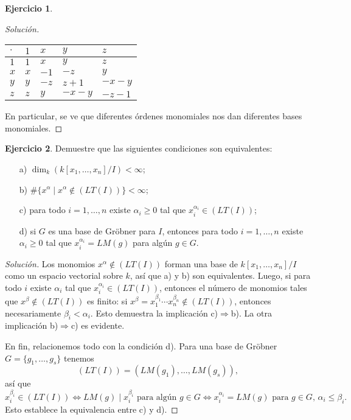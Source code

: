 \documentclass{article}
\theoremstyle{definition}
\newtheorem{ejerc}{Ejercicio}
\newenvironment{solucion}{\begin{proof}[Solución]}{\end{proof}}
\begin{document}
\begin{ejerc}
\begin{solucion}
    \begin{center}
\begin{tabular}{f{1.25cm}|f{1.25cm}|f{1.25cm}|f{1.25cm}|f{1.25cm}}
$\cdot$ & $1$ & $x$ & $y$ & $z$ \tabularnewline
\hline
$1$ & $1$ & $x$ & $y$ & $z$ \tabularnewline
\hline
$x$ & $x$ & $-1$ & $-z$ & $y$ \tabularnewline
\hline
$y$ & $y$ & $-z$ & $z+1$ & $-x-y$ \tabularnewline
\hline
$z$ & $z$ & $y$ & $-x - y$ & $-z-1$ \tabularnewline
\end{tabular}
    \end{center}

    En particular, se ve que diferentes órdenes monomiales nos dan diferentes
    bases monomiales.
  \end{solucion}\fi
\end{ejerc}

\begin{ejerc}
  Demuestre que las siguientes condiciones son equivalentes:

  \begin{enumerate}
  \item[a)] $\dim_k (k [x_1,\ldots,x_n]/I) < \infty$;

  \item[b)] $\#\{ x^\alpha \mid x^\alpha \notin (LT (I)) \} < \infty$;

  \item[c)] para todo $i = 1,\ldots,n$ existe $\alpha_i \ge 0$ tal que
    $x_i^{\alpha_i} \in (LT (I))$;

  \item[d)] si $G$ es una base de Gröbner para $I$, entonces para todo
    $i = 1,\ldots,n$ existe $\alpha_i \ge 0$ tal que $x_i^{\alpha_i} = LM (g)$
    para algún $g\in G$.
  \end{enumerate}

  \ifdefined\solutions\begin{solucion}
    Los monomios $x^\alpha \notin (LT (I))$ forman una base de
    $k [x_1,\ldots,x_n]/I$ como un espacio vectorial sobre $k$, así que a) y b)
    son equivalentes. Luego, si para todo $i$ existe $\alpha_i$ tal que
    $x_i^{\alpha_i} \in (LT (I))$, entonces el número de monomios tales que
    $x^\beta \notin (LT (I))$ es finito: si
    $x^\beta = x_1^{\beta_1}\cdots x_n^{\beta_n} \notin (LT (I))$, entonces
    necesariamente $\beta_i < \alpha_i$. Esto demuestra la implicación
    {c)$\Rightarrow$b)}. La otra implicación {b)$\Rightarrow$c)} es evidente.

    En fin, relacionemos todo con la condición d). Para una base de Gröbner
    $G = \{ g_1, \ldots, g_s \}$ tenemos
    $$(LT (I)) = (LM (g_1), \ldots, LM (g_s)),$$
    así que
    \[ x_i^{\beta_i} \in (LT (I)) \iff
       LM (g) \mid x_i^{\beta_i} \text{ para algún }g\in G \iff
       x_i^{\alpha_i} = LM (g)\text{ para }g\in G, \, \alpha_i \le \beta_i. \]
    Esto establece la equivalencia entre c) y d).
\end{solucion}\fi
\end{ejerc}
\end{document}
